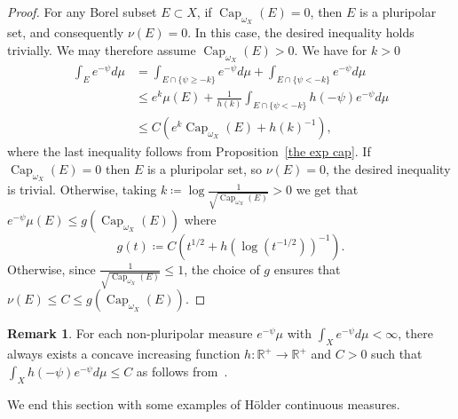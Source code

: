 \documentclass[a4paper,11pt]{amsart}
\numberwithin{equation}{section}
\theoremstyle{definition}
\newtheorem{remark}[theorem]{Remark}
\newcommand{\capacity}{\mathop{\mathrm{Cap}}\nolimits}
\begin{document}
\begin{proof}
    For any Borel subset $E\subset X$, if $\capacity_{\omega_X}(E)=0$, then $E$ is a pluripolar set, and consequently $\nu(E)=0$. In this case, the desired inequality holds trivially.
We may therefore assume $\capacity_{\omega_X}(E)>0$. We have for $k>0$
    \begin{align*}
        \int_E e^{-\psi}d\mu&=\int_{E\cap\{\psi\geq -k \} } e^{-\psi}d\mu+\int_{E\cap \{\psi<-k \}}e^{-\psi}d\mu\\
        &\leq e^k\mu(E)+ \frac{1}{h(k)}\int_{E\cap \{\psi<-k \}}h(-\psi)e^{-\psi}d\mu\\
        &\leq C(e^k\capacity_{\omega_X}(E)+{h(k)}^{-1}),
    \end{align*}
    where the last inequality follows from Proposition~\ref{the exp cap}. 
    If $\capacity_{\omega_X}(E)=0$ then $E$ is a pluripolar set, so $\nu(E)=0$, the desired inequality is trivial.
 Otherwise, taking $k\coloneqq\log \frac{1}{\sqrt{\capacity_{\omega_X}(E)}}>0$ we get that $e^{-\psi}\mu(E)\leq g(\capacity_{\omega_X}(E))$ where
    \[ g(t)\coloneqq C(t^{1/2}+h(\log (t^{-1/2}))^{-1}).\]
     Otherwise, since $\frac{1}{\sqrt{\capacity_{\omega_X}(E)}}\leq 1$, the choice of $g$ ensures that $\nu(E)\leq C\leq g(\capacity_{\omega_X}(E))$.
\end{proof}
\begin{remark}\label{rmk: hC}
    For each non-pluripolar measure $e^{-\psi}\mu$ with $\int_Xe^{-\psi}d\mu<\infty$, there always exists a concave increasing function $h\colon \mathbb{R}^+
    \to\mathbb R^+$ and $C>0$ such that $\int_X h(-\psi)e^{-\psi}d\mu\leq C$ as follows from~\cite[Lemma 3.3]{boucksom2010monge}. 
\end{remark}
We end this section with some examples of H\"older continuous measures.
\end{document}
